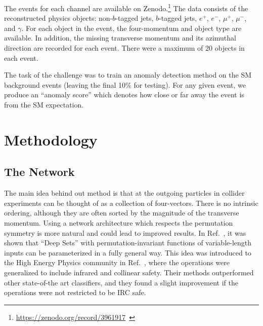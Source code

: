 \documentclass[submission, Phys]{SciPost}
\begin{document}
The events for each channel are available on Zenodo.\footnote{\url{https://zenodo.org/record/3961917}~\cite{darkmachines_community_2020_3961917}}
The data consists of the reconstructed physics objects: non-$b$-tagged jets, $b$-tagged jets, $e^+$, $e^-$, $\mu^+$, $\mu^-$, and $\gamma$.
For each object in the event, the four-momentum and object type are available.
In addition, the missing transverse momentum and its azimuthal direction are recorded for each event.
There were a maximum of 20 objects in each event.

The task of the challenge was to train an anomaly detection method on the SM background events (leaving the final 10\% for testing). For any given event, we produce an ``anomaly score'' which denotes how close or far away the event is from the SM expectation.


\section{Methodology}
\label{sec:Methods}

\subsection{The Network}
\label{sec:network}
The main idea behind out method is that at the outgoing particles in collider experiments can be thought of as a collection of four-vectors.
There is no intrinsic ordering, although they are often sorted by the magnitude of the transverse momentum.
Using a network architecture which respects the permutation symmetry is more natural and could lead to improved results.
In Ref.~\cite{2017arXiv170306114Z}, it was shown that ``Deep Sets'' with permutation-invariant functions of variable-length inputs can be parameterized in a fully general way.
This idea was introduced to the High Energy Physics community in Ref.~\cite{2019JHEP...01..121K}, where the operations were generalized to include infrared and collinear safety.
Their methods outperformed other state-of-the art classifiers, and they found a slight improvement if the operations were not restricted to be IRC safe.
\end{document}
